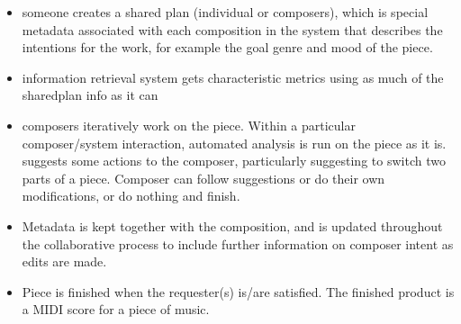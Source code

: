 \documentclass[final,authoryear,5p,times,twocolumn]{elsarticle}
\begin{document}
 
 \begin{itemize}
 
 \item someone creates a shared plan (individual or composers), which is special metadata associated with each composition in the system that describes the intentions for the work, for example the goal genre and mood of the piece.
 
 \item information retrieval system gets characteristic metrics using as much of the sharedplan info as it can
 
 \item composers iteratively work on the piece. Within a particular composer/system interaction, automated analysis is run on the piece as it is.
suggests some actions to the composer, particularly suggesting to switch two parts of a piece.
Composer can follow suggestions or do their own modifications, or do nothing and finish.
 
 \item Metadata is kept together with the composition, and is updated throughout the collaborative process to include further information on composer intent as edits are made.  
 
 \item Piece is finished when the requester(s) is/are satisfied. The finished product is a MIDI score for a piece of music.
 
 \end{itemize}
\end{document}
